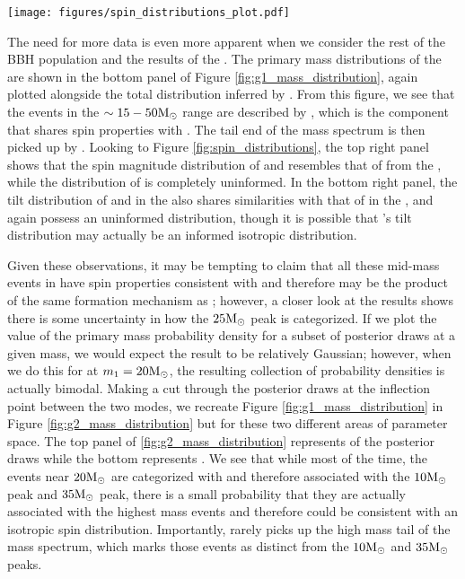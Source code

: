 \begin{figure*}[ht!]
    \begin{centering}
        \texttt{[image: figures/spin\_distributions\_plot.pdf]}
        \caption{The marginal primary spin magnitude distribution}
        \label{fig:spin_distributions}
    \end{centering}
\end{figure*}

The need for more data is even more apparent when we consider the rest of the BBH population and the results of the \comp{}. The primary mass distributions of the \comp{} are shown in the bottom panel of Figure \ref{fig:g1_mass_distribution}, again plotted alongside the total distribution inferred by \brucepaper{}. From this figure, we see that the events in the $\sim15-50 {\rm M}_\odot$ range are described by \contA{}, which is the component that shares spin properties with \first{}. The tail end of the mass spectrum is then picked up by \contB{}. Looking to Figure \ref{fig:spin_distributions}, the top right panel shows that the spin magnitude distribution of \first{} and \contA{} resembles that of \first{} from the \base{}, while the distribution of \contB{} is completely uninformed. In the bottom right panel, the tilt distribution of \first{} and \contA{} in the \comp{} also shares similarities with that of \first{} in the \base{}, and again \contB{} possess an uninformed distribution, though it is possible that \contB{}'s tilt distribution may actually be an informed isotropic distribution.

Given these observations, it may be tempting to claim that all these mid-mass events in \contA{} have spin properties consistent with \first{} and therefore may be the product of the same formation mechanism as \first{}; however, a closer look at the results shows there is some uncertainty in how the $25 {\rm M}_\odot$ peak is categorized. If we plot the value of the primary mass probability density for a subset of posterior draws at a given mass, we would expect the result to be relatively Gaussian; however, when we do this for \contB{} at $m_1 = 20 {\rm M}_\odot$, the resulting collection of probability densities is actually bimodal. Making a cut through the posterior draws at the inflection point between the two modes, we recreate Figure \ref{fig:g1_mass_distribution} in Figure \ref{fig:g2_mass_distribution} but for these two different areas of parameter space. The top panel of \ref{fig:g2_mass_distribution} represents  of the posterior draws while the bottom represents . We see that while most of the time, the events near $20{\rm M}_\odot$ are categorized with \contA{} and therefore associated with the $10{\rm M}_\odot$ peak and $35{\rm M}_\odot$ peak, there is a small probability that they are actually associated with the highest mass events and therefore could be consistent with an isotropic spin distribution. Importantly, \contA{} rarely picks up the high mass tail of the mass spectrum, which marks those events as distinct from the $10{\rm M}_\odot$ and $35{\rm M}_\odot$ peaks. 

